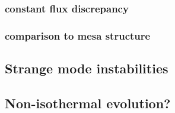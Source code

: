 \subsubsection{constant flux discrepancy}
\subsubsection{comparison to mesa structure}

\subsection{Strange mode instabilities}

\subsection{Non-isothermal evolution?}
